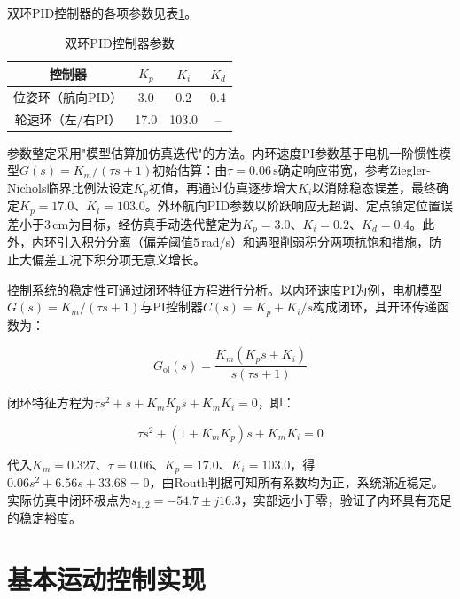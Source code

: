 {{    双环PID控制器的各项参数见表\ref{tab:pid_params}。
    \begin{table}[htbp]
    \wuhao
    \centering
    \caption{双环PID控制器参数}
    \label{tab:pid_params}
    \begin{tabular}{cccc}
    \toprule
    控制器 & $K_p$ & $K_i$ & $K_d$ \\
    \midrule
    位姿环（航向PID） & 3.0 & 0.2 & 0.4 \\
    轮速环（左/右PI） & 17.0 & 103.0 & -- \\
    \bottomrule
    \end{tabular}
    \end{table}

    参数整定采用"模型估算加仿真迭代"的方法。内环速度PI参数基于电机一阶惯性模型$G(s)=K_m/(\tau s+1)$初始估算：由$\tau=0.06\,\mathrm{s}$确定响应带宽，参考Ziegler-Nichols临界比例法设定$K_p$初值，再通过仿真逐步增大$K_i$以消除稳态误差，最终确定$K_p=17.0$、$K_i=103.0$。外环航向PID参数以阶跃响应无超调、定点镇定位置误差小于3\,cm为目标，经仿真手动迭代整定为$K_p=3.0$、$K_i=0.2$、$K_d=0.4$。此外，内环引入积分分离（偏差阈值5\,rad/s）和遇限削弱积分两项抗饱和措施，防止大偏差工况下积分项无意义增长。

    控制系统的稳定性可通过闭环特征方程进行分析。以内环速度PI为例，电机模型$G(s)=K_m/(\tau s+1)$与PI控制器$C(s)=K_p+K_i/s$构成闭环，其开环传递函数为：

    \begin{equation}
    G_{\text{ol}}(s) = \frac{K_m(K_p s + K_i)}{s(\tau s + 1)}
    \label{eq:open_loop}
    \end{equation}

    闭环特征方程为$\tau s^2 + s + K_m K_p s + K_m K_i = 0$，即：

    \begin{equation}
    \tau s^2 + (1 + K_m K_p)s + K_m K_i = 0
    \label{eq:characteristic}
    \end{equation}

    代入$K_m=0.327$、$\tau=0.06$、$K_p=17.0$、$K_i=103.0$，得$0.06s^2 + 6.56s + 33.68 = 0$，由Routh判据可知所有系数均为正，系统渐近稳定。实际仿真中闭环极点为$s_{1,2}=-54.7 \pm j16.3$，实部远小于零，验证了内环具有充足的稳定裕度。
    }
    \section{基本运动控制实现}
    }
